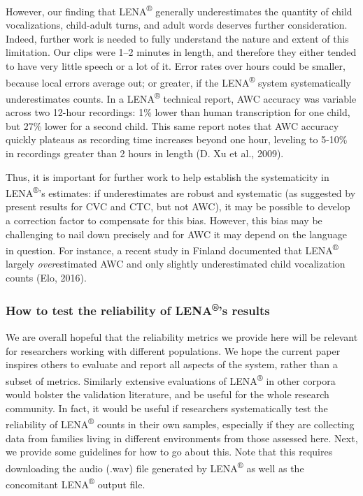 \documentclass[english,floatsintext,man]{apa6}
\begin{document}
However, our finding that LENA\textsuperscript{®} generally
underestimates the quantity of child vocalizations, child-adult turns,
and adult words deserves further consideration. Indeed, further work is
needed to fully understand the nature and extent of this limitation. Our
clips were 1--2 minutes in length, and therefore they either tended to
have very little speech or a lot of it. Error rates over hours could be
smaller, because local errors average out; or greater, if the
LENA\textsuperscript{®} system systematically underestimates counts. In
a LENA\textsuperscript{®} technical report, AWC accuracy was variable
across two 12-hour recordings: 1\% lower than human transcription for
one child, but 27\% lower for a second child. This same report notes
that AWC accuracy quickly plateaus as recording time increases beyond
one hour, leveling to 5-10\% in recordings greater than 2 hours in
length (D. Xu et al., 2009).

Thus, it is important for further work to help establish the
systematicity in LENA\textsuperscript{®}'s estimates: if underestimates
are robust and systematic (as suggested by present results for CVC and
CTC, but not AWC), it may be possible to develop a correction factor to
compensate for this bias. However, this bias may be challenging to nail
down precisely and for AWC it may depend on the language in question.
For instance, a recent study in Finland documented that
LENA\textsuperscript{®} largely \emph{over}estimated AWC and only
slightly underestimated child vocalization counts (Elo, 2016).

\subsubsection{\texorpdfstring{How to test the reliability of
LENA\textsuperscript{®}'s
results}{How to test the reliability of LENA®'s results}}\label{how-to-test-the-reliability-of-lenas-results}

We are overall hopeful that the reliability metrics we provide here will
be relevant for researchers working with different populations. We hope
the current paper inspires others to evaluate and report all aspects of
the system, rather than a subset of metrics. Similarly extensive
evaluations of LENA\textsuperscript{®} in other corpora would bolster
the validation literature, and be useful for the whole research
community. In fact, it would be useful if researchers systematically
test the reliability of LENA\textsuperscript{®} counts in their own
samples, especially if they are collecting data from families living in
different environments from those assessed here. Next, we provide some
guidelines for how to go about this. Note that this requires downloading
the audio (.wav) file generated by LENA\textsuperscript{®} as well as
the concomitant LENA\textsuperscript{®} output file.
\end{document}
